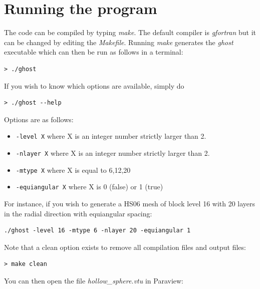 \documentclass[a4paper]{article}
\begin{document}
\section{Running the program}

The code can be compiled by typing {\sl make}. The default compiler is {\sl gfortran}
but it can be changed by editing the {\sl Makefile}. 
Running {\sl make} generates the {\sl ghost} executable which can then be run as follows
in a terminal:

\begin{verbatim}
> ./ghost
\end{verbatim}

If you wish to know which options are available, simply do 
\begin{verbatim}
> ./ghost --help
\end{verbatim}

Options are as follows:
\begin{itemize}
\item {\tt -level X} where X is an integer number strictly larger than 2.
\item {\tt -nlayer X} where X is an integer number strictly larger than 2.
\item {\tt -mtype X} where X is equal to 6,12,20
\item {\tt -equiangular X} where X is 0 (false) or 1 (true) 
\end{itemize}

For instance, if you wish to generate a HS06 mesh of block level 16
with 20 layers in the radial direction with equiangular spacing:
\begin{verbatim}
./ghost -level 16 -mtype 6 -nlayer 20 -equiangular 1
\end{verbatim}

Note that a clean option exists to remove all compilation files and output files:
\begin{verbatim}
> make clean 
\end{verbatim}


\newpage

You can then open the file {\sl hollow\_sphere.vtu} in Paraview:
\end{document}
